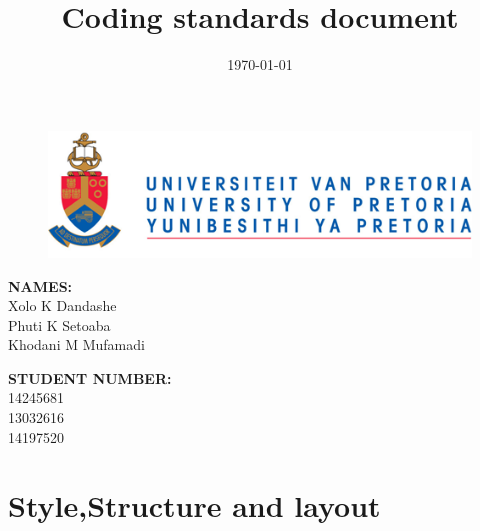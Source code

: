 \documentclass[english]{article}
\title{Coding standards document\\}
\date{\today}
\begin{document}
	\maketitle
	\begin{figure}[!t]
		\includegraphics{images/up_logo.png}
	\end{figure}
	\begin{minipage}{0.4\textwidth}
		\begin{flushleft} \large
			\textbf{NAMES:}\\[0.4cm]
			Xolo K Dandashe\\
			Phuti K Setoaba\\
			Khodani M Mufamadi
			
		\end{flushleft}
	\end{minipage}
	\begin{minipage}{0.4\textwidth}
		\begin{flushright} \large
			\textbf{STUDENT NUMBER:} \\[0.4cm]
			14245681\\ 	
			13032616\\	
			14197520
		\end{flushright}
	\end{minipage}
	
	
	
	\newpage


	\section{Style,Structure and layout}
			
	
\end{document}
